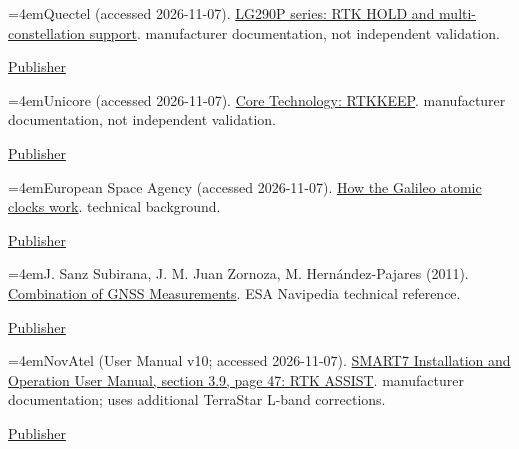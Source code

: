 \documentclass[11pt,a4paper]{article}
\numberwithin{equation}{section}
\numberwithin{figure}{section}
\begin{document}
\begin{samepage}\noindent\hangindent=4emQuectel (accessed 2026-11-07). \href{https://www.quectel.com/product/gnss-lg290p/}{LG290P series: RTK HOLD and multi-constellation support}. manufacturer documentation, not independent validation.
{\small \href{https://www.quectel.com/product/gnss-lg290p/}{Publisher}\par}
\end{samepage}\medskip
\begin{samepage}\noindent\hangindent=4emUnicore (accessed 2026-11-07). \href{https://en.unicorecomm.com/core-technology/}{Core Technology: RTKKEEP}. manufacturer documentation, not independent validation.
{\small \href{https://en.unicorecomm.com/core-technology/}{Publisher}\par}
\end{samepage}\medskip
\begin{samepage}\noindent\hangindent=4emEuropean Space Agency (accessed 2026-11-07). \href{https://www.esa.int/Applications/Satellite_navigation/How_the_Galileo_atomic_clocks_work}{How the Galileo atomic clocks work}. technical background.
{\small \href{https://www.esa.int/Applications/Satellite_navigation/How_the_Galileo_atomic_clocks_work}{Publisher}\par}
\end{samepage}\medskip
\begin{samepage}\noindent\hangindent=4emJ. Sanz Subirana, J. M. Juan Zornoza, M. Hernández-Pajares (2011). \href{https://gssc.esa.int/navipedia/index.php?title=Combination_of_GNSS_Measurements}{Combination of GNSS Measurements}. ESA Navipedia technical reference.
{\small \href{https://gssc.esa.int/navipedia/index.php?title=Combination_of_GNSS_Measurements}{Publisher}\par}
\end{samepage}\medskip
\begin{samepage}\noindent\hangindent=4emNovAtel (User Manual v10; accessed 2026-11-07). \href{https://docs.novatel.com/OEM7/Content/PDFs/PreviousVersions/SMART7_Installation_Operation_Manual_v10.pdf}{SMART7 Installation and Operation User Manual, section 3.9, page 47: RTK ASSIST}. manufacturer documentation; uses additional TerraStar L-band corrections.
{\small \href{https://docs.novatel.com/OEM7/Content/PDFs/PreviousVersions/SMART7_Installation_Operation_Manual_v10.pdf}{Publisher}\par}
\end{samepage}\medskip
\end{document}
